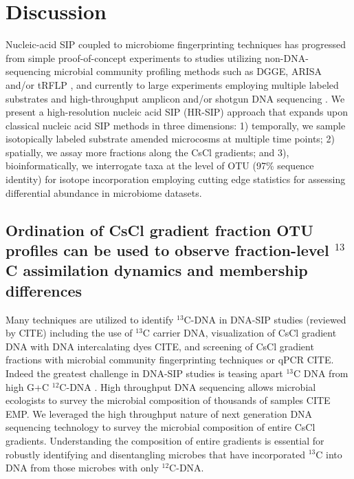 \section{Discussion} 
Nucleic-acid SIP coupled to microbiome fingerprinting
techniques has progressed from simple proof-of-concept experiments
\citep{radajewski2000stable} to studies utilizing non-DNA-sequencing microbial
community profiling methods such as DGGE, ARISA and/or tRFLP
\citep{Haichar_2007}, and currently to large experiments employing multiple
labeled substrates and high-throughput amplicon and/or shotgun DNA sequencing
\citep{Verastegui_2014}. We present a high-resolution nucleic acid SIP (HR-SIP)
approach that expands upon classical nucleic acid SIP methods in three
dimensions: 1) temporally, we sample isotopically labeled substrate amended
microcosms at multiple time points; 2) spatially, we assay more fractions along
the CsCl gradients; and 3), bioinformatically, we interrogate taxa at the level
of OTU (97\% sequence identity)  for isotope incorporation employing cutting
edge statistics for assessing differential abundance in microbiome datasets.

\subsection{Ordination of CsCl gradient fraction OTU profiles can be used to
    observe fraction-level $^{13}$C assimilation dynamics and membership
    differences}
Many techniques are utilized to identify $^{13}$C-DNA in DNA-SIP studies
(reviewed by CITE) including the use of $^{13}$C carrier DNA, visualization of
CsCl gradient DNA with DNA intercalating dyes CITE, and screening of CsCl
gradient fractions with microbial community fingerprinting techniques or qPCR
CITE. Indeed the greatest challenge in DNA-SIP studies is teasing apart
$^{13}$C DNA from high G+C $^{12}$C-DNA \citep{Buckley_2007}. High throughput
DNA sequencing allows microbial ecologists to survey the microbial composition
of thousands of samples CITE EMP. We leveraged the high throughput nature of
next generation DNA sequencing technology to survey the microbial composition
of entire CsCl gradients.  Understanding the composition of entire gradients is
essential for robustly identifying and disentangling microbes that have
incorporated $^{13}$C into DNA from those microbes with only $^{12}$C-DNA.

